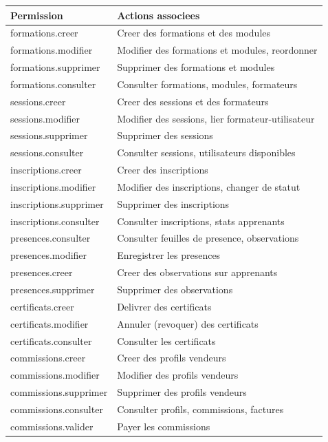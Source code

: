 \documentclass[a4paper,11pt]{article}
\begin{document}
\begin{longtable}{ll}
  \toprule
  \textbf{Permission} & \textbf{Actions associees} \\
  \midrule
  \endhead
  formations.creer & Creer des formations et des modules \\
  formations.modifier & Modifier des formations et modules, reordonner \\
  formations.supprimer & Supprimer des formations et modules \\
  formations.consulter & Consulter formations, modules, formateurs \\
  sessions.creer & Creer des sessions et des formateurs \\
  sessions.modifier & Modifier des sessions, lier formateur-utilisateur \\
  sessions.supprimer & Supprimer des sessions \\
  sessions.consulter & Consulter sessions, utilisateurs disponibles \\
  inscriptions.creer & Creer des inscriptions \\
  inscriptions.modifier & Modifier des inscriptions, changer de statut \\
  inscriptions.supprimer & Supprimer des inscriptions \\
  inscriptions.consulter & Consulter inscriptions, stats apprenants \\
  presences.consulter & Consulter feuilles de presence, observations \\
  presences.modifier & Enregistrer les presences \\
  presences.creer & Creer des observations sur apprenants \\
  presences.supprimer & Supprimer des observations \\
  certificats.creer & Delivrer des certificats \\
  certificats.modifier & Annuler (revoquer) des certificats \\
  certificats.consulter & Consulter les certificats \\
  commissions.creer & Creer des profils vendeurs \\
  commissions.modifier & Modifier des profils vendeurs \\
  commissions.supprimer & Supprimer des profils vendeurs \\
  commissions.consulter & Consulter profils, commissions, factures \\
  commissions.valider & Payer les commissions \\
  \bottomrule
\end{longtable}
\end{document}
